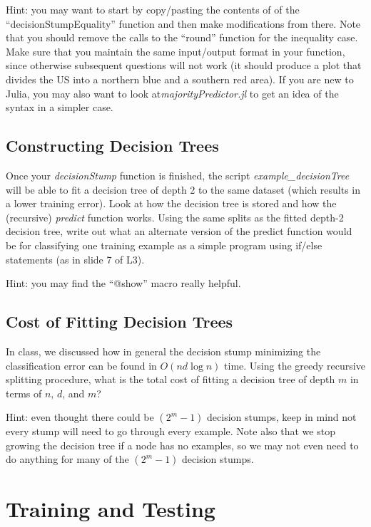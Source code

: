 \documentclass{article}
\def\blu#1{{\color{blu}#1}}
\begin{document}
Hint: you may want to start by copy/pasting the contents of of the ``decisionStumpEquality'' function and then make modifications from there. Note that you should remove the calls to the ``round'' function for the inequality case.  Make sure that you maintain the same input/output format in your function, since otherwise subsequent questions will not work (it should produce a plot that divides the US into a northern blue and a southern red area).
If you are new to Julia, you may also want to look at\emph{majorityPredictor.jl} to get an idea of the syntax in  a simpler case.

\subsection{Constructing Decision Trees}

Once your \emph{decisionStump} function is finished, the script \emph{example\_decisionTree} will be able to fit a decision tree of depth 2 to the same dataset (which results in a lower training error). Look at how the decision tree is stored and how the (recursive) \emph{predict} function works. \blu{Using the same splits as the fitted depth-2 decision tree, write out what an alternate version of the predict function would be for classifying one training example as a simple program using if/else statements (as in slide 7 of L3).}

Hint: you may find the ``@show'' macro really helpful.



\subsection{Cost of Fitting Decision Trees}

In class, we discussed how in general the decision stump minimizing the classification error can be found in $O(nd\log n)$ time. Using the greedy recursive splitting procedure, \blu{what is the total cost of fitting a decision tree of depth $m$ in terms of $n$, $d$, and $m$?} 

Hint: even thought there could be $(2^m-1)$ decision stumps, keep in mind not every stump will need to go through every example. Note also that we stop growing the decision tree if a node has no examples, so we may not even need to do anything for many of the $(2^m-1)$ decision stumps.


\section{Training and Testing}
\end{document}

